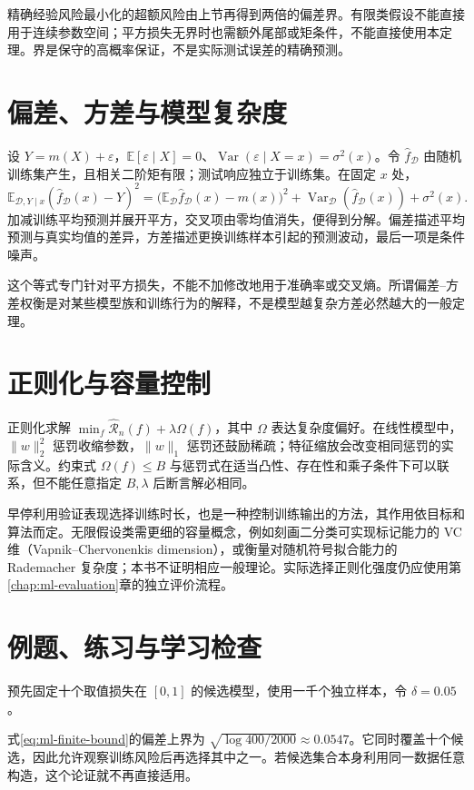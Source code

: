 \documentclass[UTF8,12pt,a4paper,fontset=fandol]{ctexbook}
\begin{document}
精确经验风险最小化的超额风险由上节再得到两倍的偏差界。有限类假设不能直接用于连续参数空间；平方损失无界时也需额外尾部或矩条件，不能直接使用本定理。界是保守的高概率保证，不是实际测试误差的精确预测。

\section{偏差、方差与模型复杂度}

设 $Y=m(X)+\varepsilon$，$\mathbb E[\varepsilon\mid X]=0$、$\operatorname{Var}(\varepsilon\mid X=x)=\sigma^2(x)$。令 $\widehat f_{\mathcal D}$ 由随机训练集产生，且相关二阶矩有限；测试响应独立于训练集。在固定 $x$ 处，
\begin{equation}
 \mathbb E_{\mathcal D,Y\mid x}(\widehat f_{\mathcal D}(x)-Y)^2
 =\bigl(\mathbb E_{\mathcal D}\widehat f_{\mathcal D}(x)-m(x)\bigr)^2
 +\operatorname{Var}_{\mathcal D}(\widehat f_{\mathcal D}(x))
 +\sigma^2(x).
 \label{eq:ml-bias-variance}
\end{equation}
加减训练平均预测并展开平方，交叉项由零均值消失，便得到分解。偏差描述平均预测与真实均值的差异，方差描述更换训练样本引起的预测波动，最后一项是条件噪声。

这个等式专门针对平方损失，不能不加修改地用于准确率或交叉熵。所谓偏差--方差权衡是对某些模型族和训练行为的解释，不是模型越复杂方差必然越大的一般定理。

\section{正则化与容量控制}

正则化求解 $\min_f\widehat{\mathcal R}_n(f)+\lambda\Omega(f)$，其中 $\Omega$ 表达复杂度偏好。在线性模型中，$\|w\|_2^2$ 惩罚收缩参数，$\|w\|_1$ 惩罚还鼓励稀疏；特征缩放会改变相同惩罚的实际含义。约束式 $\Omega(f)\leq B$ 与惩罚式在适当凸性、存在性和乘子条件下可以联系，但不能任意指定 $B,\lambda$ 后断言解必相同。

早停利用验证表现选择训练时长，也是一种控制训练输出的方法，其作用依目标和算法而定。无限假设类需更细的容量概念，例如刻画二分类可实现标记能力的 VC 维（Vapnik--Chervonenkis dimension），或衡量对随机符号拟合能力的 Rademacher 复杂度；本书不证明相应一般理论。实际选择正则化强度仍应使用第\ref{chap:ml-evaluation}章的独立评价流程。

\section{例题、练习与学习检查}

\begin{example}[模型数量的代价]
预先固定十个取值损失在 $[0,1]$ 的候选模型，使用一千个独立样本，令 $\delta=0.05$。
\end{example}
\begin{solve}
式\eqref{eq:ml-finite-bound}的偏差上界为 $\sqrt{\log400/2000}\approx0.0547$。它同时覆盖十个候选，因此允许观察训练风险后再选择其中之一。若候选集合本身利用同一数据任意构造，这个论证就不再直接适用。
\end{solve}
\end{document}
